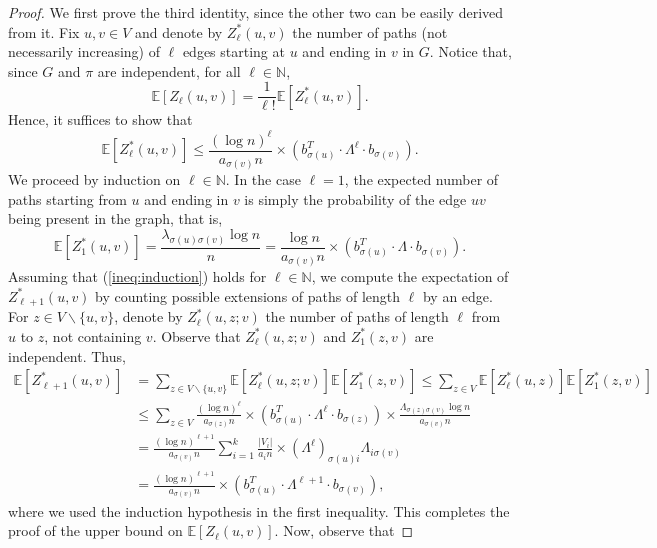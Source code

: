 \documentclass[10pt,a4paper]{amsart}
\newcommand\bE{{\mathbb E}}
\newcommand\bN{{\mathbb N}}
\begin{document}
\begin{proof}
We first prove the third identity, since the other two can be easily derived from it. Fix $u,v\in V$ and denote by $Z^*_\ell(u,v)$ the number of paths (not necessarily increasing) of $\ell$ edges starting at $u$ and ending in $v$ in $G$. Notice that, since $G$ and $\pi$ are independent, for all $\ell \in \bN$,
$$\bE[Z_\ell(u,v)] = \frac{1}{\ell!} \bE[Z^*_\ell(u,v)]. $$
Hence, it suffices to show that
\begin{equation}
\label{ineq:induction}
\bE[Z^*_\ell(u,v) ]\leq \frac{(\log n)^\ell }{a_{\sigma(v)}n} \times (b_{\sigma(u)}^T \cdot \Lambda^\ell \cdot b_{\sigma(v)}). \end{equation}
We proceed by induction on $\ell \in \bN$. In the case $\ell =1$, the expected number of paths starting from $u$ and ending in $v$ is simply the probability of the edge $uv$ being present in the graph, that is,
$$\bE[Z^*_1(u,v)] = \frac{\lambda_{\sigma(u)\sigma(v)}\log n}{n} = \frac{\log n}{a_{\sigma(v)}n}\times (b^T_{\sigma(u)}\cdot \Lambda\cdot b_{\sigma(v)}). $$
Assuming that (\ref{ineq:induction}) holds for $\ell \in \bN$, we compute the expectation of $Z^*_{\ell+1}(u,v)$ by counting possible extensions of paths of length $\ell$ by an edge. For $z\in V\backslash\{u,v\}$, denote by $Z^*_\ell(u,z;v)$ the number of paths of length $\ell$ from $u$ to $z$, not containing $v$. Observe that $Z^*_{\ell}(u,z;v)$ and $Z^*_1(z,v)$ are independent. Thus,
\begin{equation*}
\begin{split}
    \bE[Z^*_{\ell+1}(u,v)] &= \sum_{z\in V\backslash\{u,v\}}\bE\left[  Z^*_\ell(u,z;v)  \right]\bE[Z^*_1(z,v)] \leq \sum_{z\in V}\bE\left[  Z^*_\ell(u,z)  \right]\bE[Z^*_1(z,v)]\\
    &\leq \sum_{z\in V} \frac{(\log n)^{\ell} }{a_{\sigma(z)}n} \times (b_{\sigma(u)}^T \cdot \Lambda^\ell \cdot b_{\sigma(z)}) \times \frac{ \Lambda_{\sigma(z)\sigma(v)}\log n}{a_{\sigma(v)}n}\\
    &= \frac{(\log n)^{\ell+1}}{a_{\sigma(v)}n} \sum_{i=1}^k \frac{|V_i|}{a_in} \times (\Lambda^\ell)_{\sigma(u)i} \Lambda_{i\sigma(v)} \\
    &= \frac{(\log n)^{\ell+1} }{a_{\sigma(v)}n} \times (b_{\sigma(u)}^T \cdot \Lambda^{\ell+1} \cdot b_{\sigma(v)}), 
\end{split}
\end{equation*}
where we used the induction hypothesis in the first inequality. This completes the proof of the upper bound on $\bE[Z_\ell(u,v)]$. Now, observe that

\end{proof}
\end{document}
